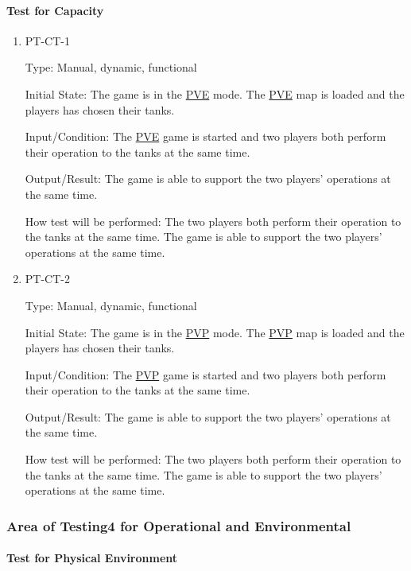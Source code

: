 \documentclass[12pt, titlepage]{article}
\begin{document}
\paragraph{Test for Capacity}

\begin{enumerate}

\item{PT-CT-1\\}

Type: Manual, dynamic, functional
					
Initial State: The game is in the \underline{PVE} mode. The \underline{PVE} map is loaded and the players has chosen their tanks.
					
Input/Condition: The \underline{PVE} game is started and two players both perform their operation to the tanks at the same time. 
					
Output/Result: The game is able to support the two players' operations at the same time.
					
How test will be performed: The two players both perform their operation to the tanks at the same time. The game is able to support the two players' operations at the same time.

\item{PT-CT-2\\}

Type: Manual, dynamic, functional
					
Initial State: The game is in the \underline{PVP} mode. The \underline{PVP} map is loaded and the players has chosen their tanks.
					
Input/Condition: The \underline{PVP} game is started and two players both perform their operation to the tanks at the same time. 
					
Output/Result: The game is able to support the two players' operations at the same time.
					
How test will be performed: The two players both perform their operation to the tanks at the same time. The game is able to support the two players' operations at the same time.

\end{enumerate}

\subsubsection{Area of Testing4 for Operational and Environmental}
\paragraph{Test for Physical Environment}
\end{document}
